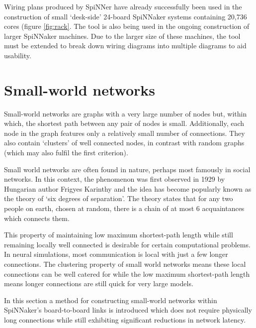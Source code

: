 			Wiring plans produced by SpiNNer have already successfully been used in
			the construction of small `desk-side' 24-board SpiNNaker systems
			containing 20,736 cores (figure \ref{fig:rack}. The tool is also being
			used in the ongoing construction of larger SpiNNaker machines. Due to the
			larger size of these machines, the tool must be extended to break down
			wiring diagrams into multiple diagrams to aid usability.
	
	
	\section{Small-world networks}
		
		
		Small-world networks are graphs with a very large number of nodes but,
		within which, the shortest path between any pair of nodes is small.
		Additionally, each node in the graph features only a relatively small number
		of connections. They also contain `clusters' of well connected nodes, in
		contrast with random graphs (which may also fulfil the first criterion).
		
		Small world networks are often found in nature, perhaps most famously in
		social networks. In this context, the phenomenon was first observed in 1929
		by Hungarian author Frigyes Karinthy\cite{karinthy29} and the idea has
		become popularly known as the theory of `six degrees of separation'. The
		theory states that for any two people on earth, chosen at random, there is a
		chain of at most 6 acquaintances which connects them.
		
		This property of maintaining low maximum shortest-path length while still
		remaining locally well connected is desirable for certain computational
		problems. In neural simulations, most communication is local with just a few
		longer connections. The clustering property of small world networks means
		these local connections can be well catered for while the low maximum
		shortest-path length means longer connections are still quick for very large
		models.
		
		In this section a method for constructing small-world networks within
		SpiNNaker's board-to-board links is introduced which does not require
		physically long connections while still exhibiting significant reductions in
		network latency.
		
